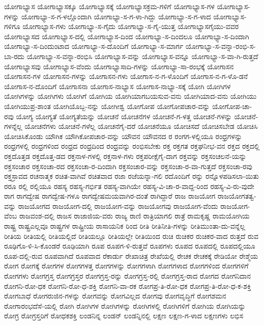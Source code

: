 {ಯೋಗಾಭ್ಯಾಸ
ಯೋಗಾಭ್ಯಾಸಕ್ಕೂ
ಯೋಗಾಭ್ಯಾಸಕ್ಕೆ
ಯೋಗಾಭ್ಯಾಸಕ್ರಮ-ಗಳಿಗೆ
ಯೋಗಾಭ್ಯಾಸ-ಗಳ
ಯೋಗಾಭ್ಯಾಸ-ಗಳನ್ನು
ಯೋಗಾಭ್ಯಾ-ಸ-ಗ-ಳಲ್ಲೊಂದಾಗಿ
ಯೋಗಾಭ್ಯಾ-ಸ-ಗ-ಳಾ-ಗಿದ್ದು
ಯೋಗಾಭ್ಯಾ-ಸ-ಗ-ಳಾದ
ಯೋಗಾಭ್ಯಾಸ-ಗಳಿಗೂ
ಯೋಗಾಭ್ಯಾಸ-ಗಳು
ಯೋಗಾಭ್ಯಾ-ಸ-ಗೈದು
ಯೋಗಾಭ್ಯಾ-ಸ-ಗೈ-ಯುತ್ತ
ಯೋಗಾಭ್ಯಾಸಗೈಯು-ವವರ
ಯೋಗಾಭ್ಯಾಸದ
ಯೋಗಾಭ್ಯಾಸ-ದಲ್ಲಿ
ಯೋಗಾಭ್ಯಾಸ-ದಿಂದ
ಯೋಗಾಭ್ಯಾ-ಸ-ದಿಂದಲೂ
ಯೋಗಾಭ್ಯಾ-ಸ-ದಿಂದಾಗಿ
ಯೋಗಾಭ್ಯಾ-ಸ-ದಿಂದುಂಟಾದ
ಯೋಗಾಭ್ಯಾ-ಸ-ದೊಂದಿಗೆ
ಯೋಗಾಭ್ಯಾ-ಸ-ಮಾರ್ಗ
ಯೋಗಾಭ್ಯಾ-ಸ-ವನ್ನಾ-ರಂಭಿ-ಸ-ಬಾ-ರದು
ಯೋಗಾಭ್ಯಾ-ಸ-ವನ್ನಾ-ರಂಭಿಸಿ
ಯೋಗಾಭ್ಯಾಸ-ವನ್ನು
ಯೋಗಾಭ್ಯಾಸ-ವನ್ನೂ
ಯೋಗಾಭ್ಯಾ-ಸ-ವಾ-ಗಿ-ರುತ್ತದೆ
ಯೋಗಾಭ್ಯಾಸವು
ಯೋಗಾಭ್ಯಾಸ-ವೆಂದು
ಯೋಗಾಭ್ಯಾಸಾದಿ-ಗಳನ್ನು
ಯೋಗಾಭ್ಯಾ-ಸಾ-ರಂಭಕ್ಕೆ
ಯೋಗಾಸನ
ಯೋಗಾಸನ-ಗಳ
ಯೋಗಾಸನ-ಗಳನ್ನು
ಯೋಗಾಸನ-ಗಳು
ಯೋಗಾಸ-ನ-ಗ-ಳೊಂದಿಗೆ
ಯೋಗಾಸ-ನ-ಗ-ಳೊ-ಡನೆ
ಯೋಗಾಸ-ನ-ದೊಂದಿಗೆ
ಯೋಗಾಸನಾ
ಯೋಗಾಸ-ನಾಭ್ಯಾಸ
ಯೋಗಾಸ-ನಾಭ್ಯಾ-ಸಕ್ಕೆ
ಯೋಗಿ
ಯೋಗಿಗಳ
ಯೋಗಿಗಳನ್ನು
ಯೋಗಿಗಳು
ಯೋಗಿಗೆ
ಯೋಗಿಯ
ಯೋಗಿಯಾಗಬಯಸುವ-ವನು
ಯೋಗಿಯಾದ-ವನು
ಯೋಗಿಯು
ಯೋಗಿಯುಪ್ರ-ಶಾಂತ
ಯೋಗಿಯೊಬ್ಬ-ನನ್ನು
ಯೋಗೀಶ್ವ
ಯೋಗೋಪ
ಯೋಗೋಪಚಾರ-ವನ್ನು
ಯೋಗೋಪ-ಚಾ-ರವು
ಯೋಗ್ಯ
ಯೋಗ್ಯತೆ
ಯೋಗ್ಯತೆಯನ್ನು
ಯೋಚನೆ
ಯೋಚನೆಗಳ
ಯೋಚನೆ-ಗ-ಳತ್ತ
ಯೋಚನೆ-ಗಳನ್ನು
ಯೋಚನೆ-ಗಳನ್ನೆಲ್ಲ
ಯೋಚನೆಗಳು
ಯೋಚನೆ-ಗಳೆಲ್ಲ
ಯೋಚನೆಗೈ-ದರೆ
ಯೋಚನೆಯೂ
ಯೋಚಿಸದೆ
ಯೋಚಿಸಬೇಡ
ಯೋಚಿಸಿ
ಯೋಚಿಸಿಕೊಂಡು
ಯೌಗಿಕ
ಯೌಗಿಕೋಪಚಾರ-ವನ್ನು
ಯೌವನ
ಯೌವನದ
ರ
ರಂಗಗ-ಳಲ್ಲಿಯೂ
ರಂಧ್ರಗಳನ್ನು
ರಂಧ್ರಗಳಲ್ಲಿ
ರಂಧ್ರಗಳಿಂದ
ರಂಧ್ರದ
ರಂಧ್ರದಿಂದ
ರಂಧ್ರವನ್ನು
ರಂಭಿಸಬೇಕು
ರಕ್ತ
ರಕ್ತಗತ
ರಕ್ತಘನೀಭ-ವನ
ರಕ್ತದ
ರಕ್ತದಲ್ಲಿ
ರಕ್ತದೊತ್ತಡ
ರಕ್ತದೊತ್ತ-ಡದ
ರಕ್ತನಾಳ-ಗಳಲ್ಲಿ
ರಕ್ತನಾಳ-ಗಳು
ರಕ್ತಪರೀಕ್ಷೆಗೈ-ದಾಗ
ರಕ್ತವನ್ನು
ರಕ್ತಸಂಚಲನೆ-ಯನ್ನು
ರಕ್ತಸಂಚಾರ
ರಕ್ತಸಂಚಾ-ರದ
ರಕ್ತಸಂಚಾ-ರ-ದಿಂದಾಗಿ
ರಕ್ತಸಂಚಾರ-ವನ್ನು
ರಕ್ತಸಂಚಾ-ರ-ವಾ-ಗುತ್ತದೆ
ರಕ್ತಸಂಚಾ-ರವು
ರಕ್ತಸ್ರಾವದ
ರಚನಾತ್ಮಕ
ರಚಿತ-ವಾಗಿವೆ
ರಚಿತವಾದ
ರಜಾ
ರಜೆಯನ್ನಾ-ಗಲಿ
ರದೊಂದಿಗೆ
ರನ್ನು
ರನ್ನೊಳಪಡಿಸಲಾ-ಯಿತು
ರರೂ
ರಲ್ಲಿ
ರಲ್ಲಿಯೂ
ರಹಸ್ಯ
ರಹಸ್ಯ-ಗರ್ಭಿತ
ರಹಸ್ಯ-ವಾಗಿಯೇ
ರಹಸ್ಯ-ವಿ-ಚಾ-ರ-ವಾದ್ದ-ರಿಂದ
ರಹಸ್ಯ-ವಿ-ರು-ವುದೇ
ರಾಗ
ರಾಗದ್ವೇಷ
ರಾಗದ್ವೇಷ-ಗಳೂ
ರಾಗದ್ವೇಷಮಯವಾಗಿರ-ದಂತೆ
ರಾಗಿದ್ದಾರೆ
ರಾಜ
ರಾಜಯೋಗ
ರಾಜಯೋಗತತ್ವ-ವನ್ನು
ರಾಜಯೋಗದ
ರಾಜಯೋಗ-ದಲ್ಲಿ
ರಾಜಯೋಗ-ವನ್ನು
ರಾಜಯೋಗವು
ರಾಜಯೋಗ-ವೆಂದು
ರಾಜಯೋಗ-ವೆಂಬ
ರಾಜವಂಶ-ದಲ್ಲಿ
ರಾಜಸ
ರಾಜಾಜಿಯ-ವರು
ರಾಜ್ಯ
ರಾಣಿ
ರಾತ್ರಿಯಾಗಲಿ
ರಾತ್ರೆ
ರಾಮಕೃಷ್ಣ
ರಾಮಯೋಗಿಯ
ರಾಷ್ಟ್ರ
ರಾಷ್ಟ್ರಎಲ್ಲವೂ
ರಾಷ್ಟ್ರಗಳ
ರಾಷ್ಟ್ರೀಯ
ರಾಸಾಯನಿಕ
ರಿಂದ
ರೀತಿ
ರೀತಿನೀತಿ-ಗಳನ್ನು
ರೀತಿಮುಂತಾ-ದು-ವನ್ನೆಲ್ಲ
ರೀತಿಯ
ರೀತಿಯಲ್ಲಿ
ರೀತಿಯಲ್ಲಿದೆ
ರೀತಿಯಲ್ಲೂ
ರೀತಿಯಲ್ಲೇ
ರೀತಿಯಿಂದ
ರುಚಿ
ರುಚಿಕರ
ರುಚಿಕರ-ವಾದ
ರುತ್ತದೆ
ರುವ
ರೂಢಿಗೊ-ಳಿ-ಸಿ-ಕೊಂಡರೆ
ರೂಢಿಯಾಗಿ
ರೂಪ
ರೂಪಗ-ಳಿ-ರುತ್ತವೆ
ರೂಪಗಳು
ರೂಪದ
ರೂಪದಲ್ಲಿ
ರೂಪದಲ್ಲಿಯೂ
ರೂಪ-ದಲ್ಲಿ-ರುವ
ರೂಪವಾಗಿದೆ
ರೂಪವಾದ
ರೆಕಾರ್ಡು
ರೇಖಾಚಿತ್ರ
ರೇಖೆಯಲ್ಲಿ
ರೇಚಕ
ರೇಚಕಕ್ಕೆ
ರೇಡಿಯೋ
ರೇಶ್ಮೆಯ
ರೋಗ
ರೋಗಕ್ಕೆ
ರೋಗಗಳ
ರೋಗಗಳತ್ತ
ರೋಗಗಳನ್ನು
ರೋಗಗಳಾಗಿ
ರೋಗಗಳಾದ
ರೋಗಗಳಿಂದ
ರೋಗಗಳಿಗೆ
ರೋಗಗಳು
ರೋಗಗ್ರಸ್ತ
ರೋಗಗ್ರಸ್ತರ
ರೋಗಗ್ರಸ್ತ-ರನ್ನು
ರೋಗಗ್ರಸ್ತ-ರಲ್ಲಿ
ರೋಗಗ್ರಸ್ತ-ರಾದ
ರೋಗದ
ರೋಗನಿದಾನ
ರೋಗನಿ-ರೋ-ಧಕ
ರೋಗನಿ-ರೋ-ಧ-ಶಕ್ತಿ
ರೋಗನಿ-ವಾ-ರಕ
ರೋಗಪ್ರ-ತಿ-ರೋ-ಧಕ
ರೋಗಪ್ರ-ತಿ-ರೋ-ಧ-ಕ-ಶಕ್ತಿ
ರೋಗಬಾಧೆ
ರೋಗರುಜಿನ-ಗಳನ್ನು
ರೋಗವನ್ನು
ರೋಗವಿಲ್ಲದ
ರೋಗವು
ರೋಗವೃದ್ಧಿಗೆ
ರೋಗಶಮನ
ರೋಗಾರಂಭದೆಸೆ-ಯಲ್ಲಿ
ರೋಗಿ
ರೋಗಿಗಳ
ರೋಗಿಗಳನ್ನು
ರೋಗಿಗಳಲ್ಲಿ
ರೋಗಿಗಳಿಗೆ
ರೋಗಿಯ
ರೋಗಿಯನ್ನು
ರೋಗ್ರ
ರೋಗ್ರಸ್ತರಿಗೆ
ರೋಧಕಶಕ್ತಿ
ಲಂಡನಿನ್ನ
ಲಂಡನ್
ಲಂಡನ್ನಿನಲ್ಲಿ
ಲಕ್ಷಣ
ಲಕ್ಷಣ-ಗ-ಳಾದ
ಲಕ್ಷಣಗಳು
ಲಭಿಸ
}
